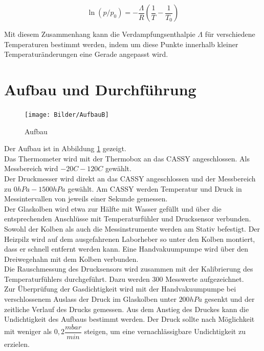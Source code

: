 \documentclass[12pt,a4paper]{article}
\begin{document}
\begin{equation}
\ln{(p/p_0)}=-\frac{\Lambda}{R} \left(\frac{1}{T}-			\frac{1}{T_0}\right)
\end{equation}

Mit diesem Zusammenhang kann die Verdampfungsenthalpie $\Lambda$ für verschiedene Temperaturen bestimmt werden, indem um diese Punkte innerhalb kleiner Temperaturänderungen eine Gerade angepasst wird.

\section{Aufbau und Durchführung}
\label{sec:Aufbau und Durchfühung}
\begin{figure}
\texttt{[image: Bilder/AufbauB]}
\caption[AufbauB]{Aufbau}
\label{fig:AufbauB}
\end{figure}

Der Aufbau ist in Abbildung \ref{fig:AufbauB} gezeigt. \\
Das Thermometer wird mit der Thermobox an das CASSY angeschlossen. Als Messbereich wird $-20C - 120C$ gewählt.\\
Der Druckmesser wird direkt an das CASSY angeschlossen und der Messbereich zu $0hPa - 1500hPa$ gewählt. Am CASSY werden Temperatur und Druck in Messintervallen von jeweils einer Sekunde gemessen. \\

Der Glaskolben wird etwa zur Hälfte mit Wasser gefüllt und über die entsprechenden Anschlüsse mit Temperaturfühler und Drucksensor verbunden. Sowohl der Kolben als auch die Messinstrumente werden am Stativ befestigt. Der Heizpilz wird auf dem ausgefahrenen Laborheber so unter den Kolben montiert, dass er schnell entfernt werden kann. Eine Handvakuumpumpe wird über den Dreiwegehahn mit dem Kolben verbunden.\\

Die Rauschmessung des Drucksensors wird zusammen mit der Kalibrierung des Temperaturfühlers durchgeführt. Dazu werden $300$ Messwerte aufgezeichnet.\\
Zur Überprüfung der Gasdichtigkeit wird mit der Handvakuumpumpe bei verschlossenem Auslass der Druck im Glaskolben unter $200hPa$ gesenkt und der zeitliche Verlauf des Drucks gemessen. Aus dem Anstieg des Druckes kann die Undichtigkeit des Aufbaus bestimmt werden. Der Druck sollte nach Möglichkeit mit weniger als $0,2 \dfrac{mbar}{min}$ steigen, um eine vernachlässigbare Undichtigkeit zu erzielen. \\
\end{document}
